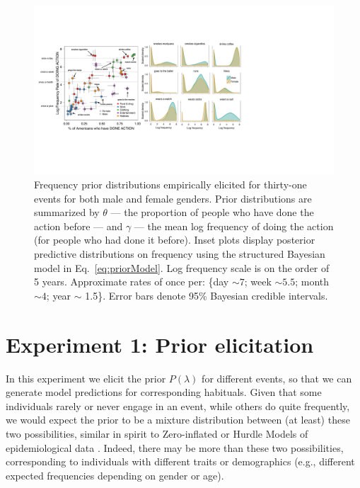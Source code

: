 \documentclass[10pt,letterpaper]{article}
\begin{document}
\begin{figure}[t]
\centering
  \includegraphics[width=\textwidth]{prior-scatter-insets3}
  \caption{Frequency prior distributions empirically elicited for thirty-one events for both male and female genders. Prior distributions are summarized by $\theta$ --- the proportion of people who have done the action before --- and $\gamma$ --- the mean log frequency of doing the action (for people who had done it before).  Inset plots display posterior predictive distributions on frequency using the structured Bayesian model in Eq.~\ref{eq:priorModel}. Log frequency scale is on the order of 5 years. Approximate rates of once per: \{day $\sim 7$; week $\sim 5.5$; month $\sim 4$; year $\sim$ 1.5\}. Error bars denote 95\% Bayesian credible intervals.}
  \label{fig:priorScatter}
\end{figure}
%


\section{Experiment 1: Prior elicitation}

%
In this experiment we elicit the prior $P(\lambda)$ for different events, so that we can generate model predictions for corresponding habituals.
Given that some individuals rarely or never engage in an event, while others do quite frequently, we would expect the prior to be a mixture distribution between (at least) these two possibilities, similar in spirit to Zero-inflated or Hurdle Models of epidemiological data \cite{hurdleModels}.
Indeed, there may be more than these two possibilities, corresponding to individuals with different traits or demographics (e.g., different expected frequencies depending on gender or age). 
\end{document}
